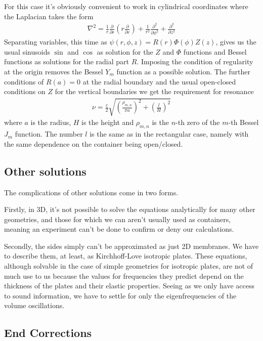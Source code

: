 \documentclass[10pt,a4paper,twocolumn]{article}
\begin{document}
For this case it's obviously convenient to work in cylindrical coordinates where the Laplacian takes the form
%
\begin{align}
\nabla^2 = \frac{1}{r} \frac{\partial}{\partial r}\left(r \frac{\partial}{\partial r}\right) + \frac{1}{r^2} \frac{\partial^2}{\partial \phi^2} + \frac{\partial^2}{\partial z^2}
\end{align}
%
Separating variables, this time as $\psi(r, \phi, z) = R(r) \Phi(\phi) Z(z)$, gives us the usual sinusoids $\sin$ and $\cos$ as solution for the $Z$ and $\Phi$ functions and Bessel functions as solutions for the radial part $R$. Imposing the condition of regularity at the origin removes the Bessel $Y_m$ function as a possible solution. The further conditions of $R(a) = 0$ at the radial boundary and the usual open-closed conditions on $Z$ for the vertical boundaries we get the requirement for resonance
%
\begin{align}
\nu = \frac{c}{2} \sqrt{\left(\frac{\rho_{m,n}}{\pi a}\right)^2 + \left(\frac{l}{H}\right)^2}
\end{align}
%
where $a$ is the radius, $H$ is the height and $\rho_{m,n}$ is the $n$-th zero of the $m$-th Bessel $J_m$ function. The number $l$ is the same as in the rectangular case, namely with the same dependence on the container being open/closed.

\subsection{Other solutions}

The complications of other solutions come in two forms.

Firstly, in 3D, it's not possible to solve the equations analytically for many other geometries, and those for which we can aren't usually used as containers, meaning an experiment can't be done to confirm or deny our calculations.

Secondly, the sides simply can't be approximated as just 2D membranes. We have to describe them, at least, as Kirchhoff-Love isotropic plates.\cite{kirchhoff} \cite{love} These equations, although solvable in the case of simple geometries for isotropic plates, are not of much use to us because the values for frequencies they predict depend on the thickness of the plates and their elastic properties. Seeing as we only have access to sound information, we have to settle for only the eigenfrequencies of the volume oscillations.

\subsection{End Corrections}
\end{document}
